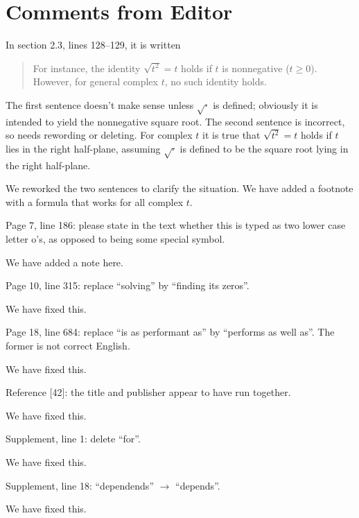 \documentclass[answers,12pt]{exam}
\begin{document}


\section{Comments from Editor}

\begin{questions}
\question  In section 2.3, lines 128--129, it is written
\begin{quote}
For instance, the identity $\sqrt{t^2} = t$ holds if $t$ is nonnegative ($t \geq
0$). However, for general complex $t$, no such identity holds.
\end{quote}
The first sentence doesn't make sense unless $\sqrt{\cdot}$ is defined;
obviously it is intended to yield the nonnegative square root. The second
sentence is incorrect, so needs rewording or deleting. For complex $t$ it is
true that $\sqrt{t^2} = t$ holds if $t$ lies in the right half-plane, assuming
$\sqrt{\cdot}$ is defined to be the square root lying in the right half-plane.
\begin{solution}
We reworked the two sentences to clarify the situation. We have added a
footnote with a formula that works for all complex $t$.
\end{solution}

\question Page 7, line 186: please state in the text whether this is typed as two lower case letter o's, as opposed to being some special symbol.
\begin{solution}
We have added a note here.
\end{solution}

\question Page 10, line 315: replace ``solving'' by ``finding its zeros''.
\begin{solution}
We have fixed this.
\end{solution}

\question Page 18, line 684: replace ``is as performant as'' by ``performs as well as''. The former is not correct English.
\begin{solution}
We have fixed this.
\end{solution}

\question Reference [42]: the title and publisher appear to have run together.
\begin{solution}
We have fixed this.
\end{solution}

\question Supplement, line 1: delete ``for''.
\begin{solution}
We have fixed this.
\end{solution}

\question Supplement, line 18: ``dependends'' $\rightarrow$ ``depends''.
\begin{solution}
We have fixed this.
\end{solution}

\end{questions}
\end{document}
